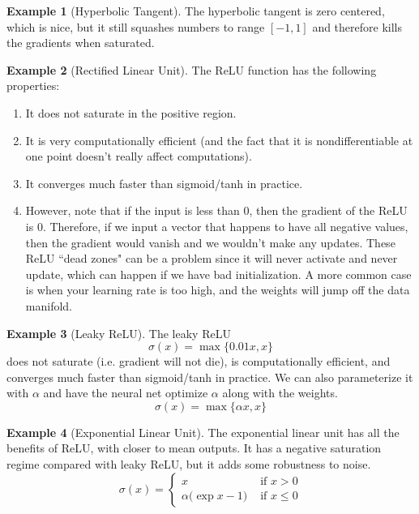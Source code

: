 \documentclass{article}
\theoremstyle{definition}
\newtheorem{example}{Example}[section]
\theoremstyle{remark}
\theoremstyle{definition}
\begin{document}
\begin{example}[Hyperbolic Tangent]
The hyperbolic tangent is zero centered, which is nice, but it still squashes numbers to range $[-1, 1]$ and therefore kills the gradients when saturated. 
\end{example}

\begin{example}[Rectified Linear Unit]
The ReLU function has the following properties: 
\begin{enumerate}
    \item It does not saturate in the positive region. 
    \item It is very computationally efficient (and the fact that it is nondifferentiable at one point doesn't really affect computations). 
    \item It converges much faster than sigmoid/tanh in practice. 
    \item However, note that if the input is less than $0$, then the gradient of the ReLU is $0$. Therefore, if we input a vector that happens to have all negative values, then the gradient would vanish and we wouldn't make any updates. These ReLU ``dead zones" can be a problem since it will never activate and never update, which can happen if we have bad initialization. A more common case is when your learning rate is too high, and the weights will jump off the data manifold. 
\end{enumerate}
\end{example}

\begin{example}[Leaky ReLU]
The leaky ReLU 
\[\sigma(x) = \max\{0.01 x, x\}\]
does not saturate (i.e. gradient will not die), is computationally efficient, and converges much faster than sigmoid/tanh in practice. We can also parameterize it with $\alpha$ and have the neural net optimize $\alpha$ along with the weights. 
\[\sigma(x) = \max\{\alpha x, x\}\]
\end{example}

\begin{example}[Exponential Linear Unit]
The exponential linear unit has all the benefits of ReLU, with closer to mean outputs. It has a negative saturation regime compared with leaky ReLU, but it adds some robustness to noise. 
\[\sigma(x) = \begin{cases} x & \text{ if } x > 0 \\ \alpha \big(\exp{x} - 1 \big) & \text{ if } x \leq 0 \end{cases}\]
\end{example}
\end{document}
